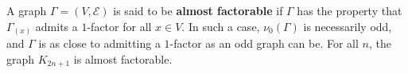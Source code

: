A graph $\Gamma = (V, \mathcal{E})$ is said to be \textbf{almost factorable} if $\Gamma$ has the property that $\Gamma_{(x)}$ admits a $1$-factor for all $x \in V$. In such a case, $\nu_0(\Gamma)$ is necessarily odd, and $\Gamma$ is as close to admitting a $1$-factor as an odd graph can be. For all $n$, the graph $K_{2n+1}$ is almost factorable.
